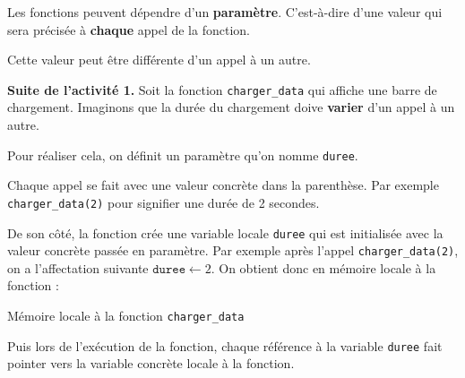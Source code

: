 \documentclass[a4paper,17pt]{extarticle}
\begin{document}
    Les fonctions peuvent dépendre d'un \textbf{paramètre}. C'est-à-dire
d'une valeur qui sera précisée à \textbf{chaque} appel de la fonction.

Cette valeur peut être différente d'un appel à un autre.
\begin{exemple}
    \textbf{Suite de l'activité 1.} Soit la fonction \texttt{charger\_data}
qui affiche une barre de chargement. Imaginons que la durée du
chargement doive \textbf{varier} d'un appel à un autre.

Pour réaliser cela, on définit un paramètre qu'on nomme \texttt{duree}.

Chaque appel se fait avec une valeur concrète dans la parenthèse. Par
exemple \texttt{charger\_data(2)} pour signifier une durée de 2
secondes.

De son côté, la fonction crée une variable locale \texttt{duree} qui est
initialisée avec la valeur concrète passée en paramètre. Par exemple
après l'appel \texttt{charger\_data(2)}, on a l'affectation suivante
\(\texttt{duree} \leftarrow 2\). On obtient donc en mémoire locale à la
fonction :

\begin{center}
    Mémoire locale à la fonction \texttt{charger\_data}\\
    {\setlength{\fboxrule}{2pt}
    }
\end{center}

Puis lors de l'exécution de la fonction, chaque référence à la variable
\texttt{duree} fait pointer vers la variable concrète locale à la
fonction.

        \end{exemple}
\end{document}
